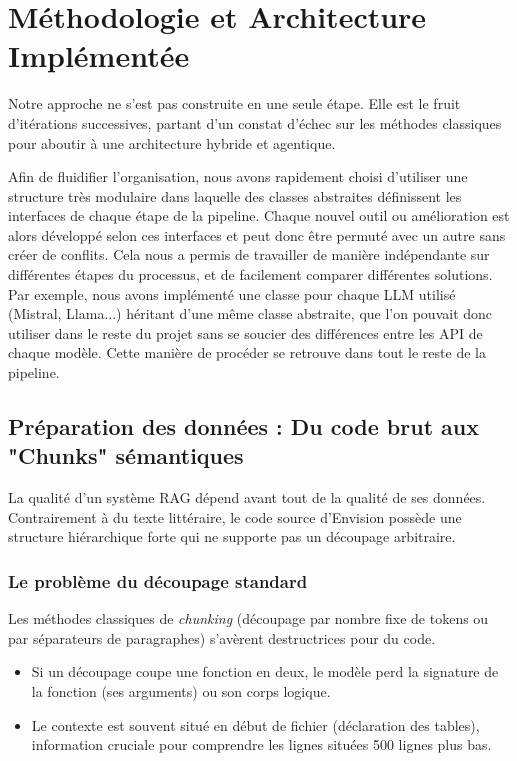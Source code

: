 \section{Méthodologie et Architecture Implémentée}

Notre approche ne s'est pas construite en une seule étape. Elle est le fruit d'itérations successives, partant d'un constat d'échec sur les méthodes classiques pour aboutir à une architecture hybride et agentique. 

Afin de fluidifier l'organisation, nous avons rapidement choisi d'utiliser une structure très modulaire dans laquelle des classes abstraites définissent les interfaces de chaque étape de la pipeline. Chaque nouvel outil ou amélioration est alors développé selon ces interfaces et peut donc être permuté avec un autre sans créer de conflits. Cela nous a permis de travailler de manière indépendante sur différentes étapes du processus, et de facilement comparer différentes solutions. Par exemple, nous avons implémenté une classe pour chaque LLM utilisé (Mistral, Llama...) héritant d'une même classe abstraite, que l'on pouvait donc utiliser dans le reste du projet sans se soucier des différences entre les API de chaque modèle. Cette manière de procéder se retrouve dans tout le reste de la pipeline.

\subsection{Préparation des données : Du code brut aux "Chunks" sémantiques}

La qualité d'un système RAG dépend avant tout de la qualité de ses données. Contrairement à du texte littéraire, le code source d'Envision possède une structure hiérarchique forte qui ne supporte pas un découpage arbitraire.

\subsubsection{Le problème du découpage standard}
Les méthodes classiques de \textit{chunking} (découpage par nombre fixe de tokens ou par séparateurs de paragraphes) s'avèrent destructrices pour du code.
\begin{itemize}
    \item Si un découpage coupe une fonction en deux, le modèle perd la signature de la fonction (ses arguments) ou son corps logique.
    \item Le contexte est souvent situé en début de fichier (déclaration des tables), information cruciale pour comprendre les lignes situées 500 lignes plus bas.
\end{itemize}

